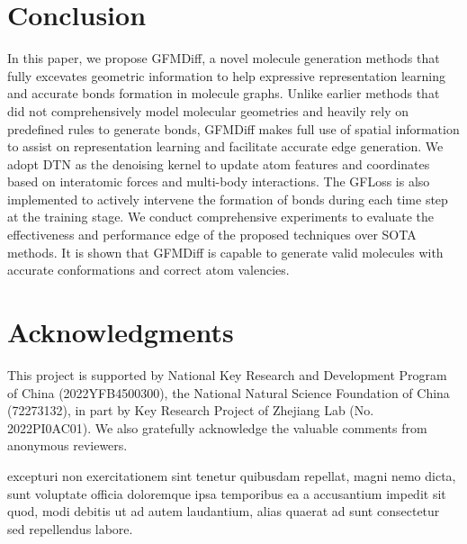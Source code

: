 \documentclass[letterpaper]{article}
\begin{document}
\section{Conclusion}
In this paper, we propose GFMDiff, a novel molecule generation methods that fully excevates geometric information to help expressive representation learning and accurate bonds formation in molecule graphs. Unlike earlier methods that did not comprehensively model molecular geometries and heavily rely on predefined rules to generate bonds, GFMDiff makes full use of spatial information to assist on representation learning and facilitate accurate edge generation. We adopt DTN as the denoising kernel to update atom features and coordinates based on interatomic forces and multi-body interactions. The GFLoss is also implemented to actively intervene the formation of bonds during each time step at the training stage. We conduct comprehensive experiments to evaluate the effectiveness and performance edge of the proposed techniques over SOTA methods. It is shown that GFMDiff is capable to generate valid molecules with accurate conformations and correct atom valencies.


\section{Acknowledgments}
This project is supported by National Key Research and Development Program of China (2022YFB4500300), the National Natural Science Foundation of China (72273132), in part by Key Research Project of Zhejiang Lab (No. 2022PI0AC01). We also gratefully acknowledge the valuable comments from anonymous reviewers.


excepturi non exercitationem sint tenetur quibusdam repellat, magni nemo dicta, sunt voluptate officia doloremque ipsa temporibus ea a accusantium impedit sit quod, modi debitis ut ad autem laudantium, alias quaerat ad sunt consectetur sed repellendus labore.\clearpage

\end{document}
